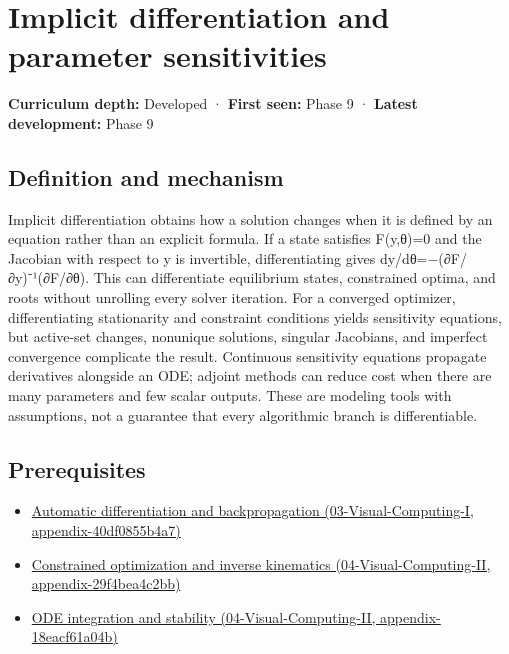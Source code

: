 \hypertarget{appendix-8836553d56fc}{}
\section{Implicit differentiation and parameter sensitivities}\label{appendix-8836553d56fc-implicit-differentiation-and-parameter-sensitivities}

\textbf{Curriculum depth:} Developed · \textbf{First seen:} Phase 9 · \textbf{Latest development:} Phase 9

\subsection{Definition and mechanism}\label{appendix-8836553d56fc-definition-and-mechanism}

Implicit differentiation obtains how a solution changes when it is defined by an equation rather than an explicit formula. If a state satisfies F(y,θ)=0 and the Jacobian with respect to y is invertible, differentiating gives dy/dθ=−(∂F/∂y)⁻¹(∂F/∂θ). This can differentiate equilibrium states, constrained optima, and roots without unrolling every solver iteration. For a converged optimizer, differentiating stationarity and constraint conditions yields sensitivity equations, but active-set changes, nonunique solutions, singular Jacobians, and imperfect convergence complicate the result. Continuous sensitivity equations propagate derivatives alongside an ODE; adjoint methods can reduce cost when there are many parameters and few scalar outputs. These are modeling tools with assumptions, not a guarantee that every algorithmic branch is differentiable.

\subsection{Prerequisites}\label{appendix-8836553d56fc-prerequisites}

\begin{itemize}
\tightlist
\item
  \href{../03-Visual-Computing-I/main.pdf\#nameddest=appendix-40df0855b4a7}{Automatic differentiation and backpropagation (03-Visual-Computing-I, appendix-40df0855b4a7)}
\item
  \href{../04-Visual-Computing-II/main.pdf\#nameddest=appendix-29f4bea4c2bb}{Constrained optimization and inverse kinematics (04-Visual-Computing-II, appendix-29f4bea4c2bb)}
\item
  \href{../04-Visual-Computing-II/main.pdf\#nameddest=appendix-18eacf61a04b}{ODE integration and stability (04-Visual-Computing-II, appendix-18eacf61a04b)}
\end{itemize}

